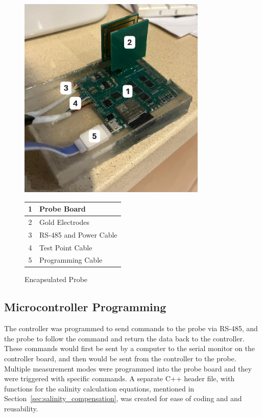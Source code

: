 \begin{figure}[H]
    \begin{minipage}{0.5\textwidth}
        \centering
        \includegraphics[width=0.8\textwidth]{Figures/encapsulated_probe.jpg}
    \end{minipage}
    \begin{minipage}{0.5\textwidth}
        \centering
        \begin{tabular}{cl} \hline
            1 & Probe Board \\ \hline
            2 & Gold Electrodes \\ \hline
            3 & RS-485 and Power Cable \\ \hline
            4 & Test Point Cable \\ \hline
            5 & Programming Cable \\ \hline
        \end{tabular}
    \end{minipage}
    \caption{Encapsulated Probe}
    \label{fig:encapsulated_probe} %
\end{figure}

\subsection{Microcontroller Programming}\label{sec:uc_program}
The controller was programmed to send commands to the probe via RS-485, and the probe to follow the command and return the data back to the controller.
These commands would first be sent by a computer to the serial monitor on the controller board, and then would be sent from the controller to the probe.
Multiple measurement modes were programmed into the probe board and they were triggered with specific commands.
A separate C++ header file, with functions for the salinity calculation equations, mentioned in Section~\ref{sec:salinity_compensation}, was created for ease of coding and and reusability.


